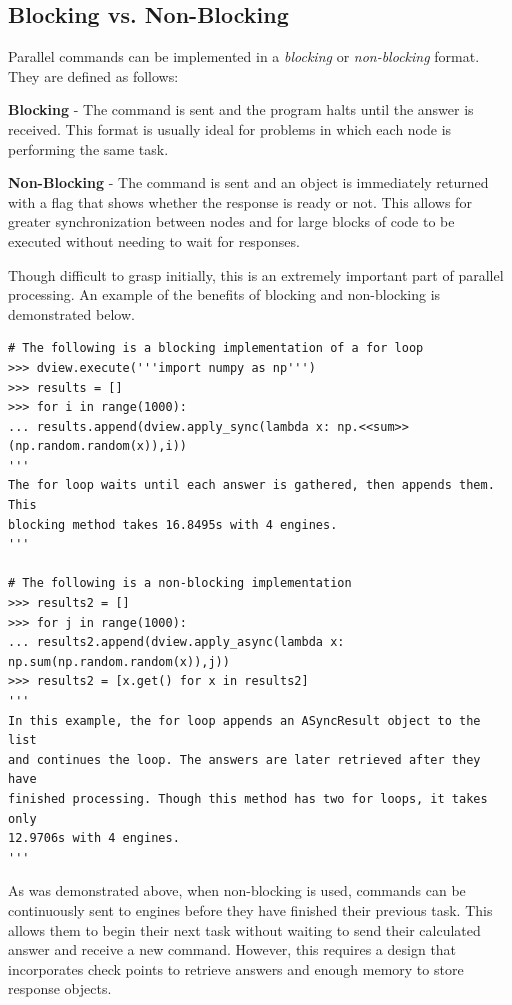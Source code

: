 \subsection*{Blocking vs. Non-Blocking}
Parallel commands can be implemented in a \emph{blocking} or \emph{non-blocking} format.
They are defined as follows:
\begin{list}{}{}
\item \textbf{Blocking} - The command is sent and the program halts until the answer is received. 
This format is usually ideal for problems in which each node is performing the same task.
\item \textbf{Non-Blocking} - The command is sent and an object is immediately returned with a flag that shows whether the response is ready or not.
This allows for greater synchronization between nodes and for large blocks of code to be executed without needing to wait for responses.
\end{list}

Though difficult to grasp initially, this is an extremely important part of parallel processing.
An example of the benefits of blocking and non-blocking is demonstrated below.

\begin{lstlisting}
# The following is a blocking implementation of a for loop
>>> dview.execute('''import numpy as np''')
>>> results = []
>>> for i in range(1000):
...	results.append(dview.apply_sync(lambda x: np.<<sum>>(np.random.random(x)),i))
''' 
The for loop waits until each answer is gathered, then appends them. This 
blocking method takes 16.8495s with 4 engines.
'''

# The following is a non-blocking implementation
>>> results2 = []
>>> for j in range(1000):
...	results2.append(dview.apply_async(lambda x: np.sum(np.random.random(x)),j))
>>> results2 = [x.get() for x in results2]
''' 
In this example, the for loop appends an ASyncResult object to the list
and continues the loop. The answers are later retrieved after they have
finished processing. Though this method has two for loops, it takes only
12.9706s with 4 engines.
'''
\end{lstlisting}

As was demonstrated above, when non-blocking is used, commands can be continuously sent to engines before they have finished their previous task.
This allows them to begin their next task without waiting to send their calculated answer and receive a new command.
However, this requires a design that incorporates check points to retrieve answers and enough memory to store response objects.

